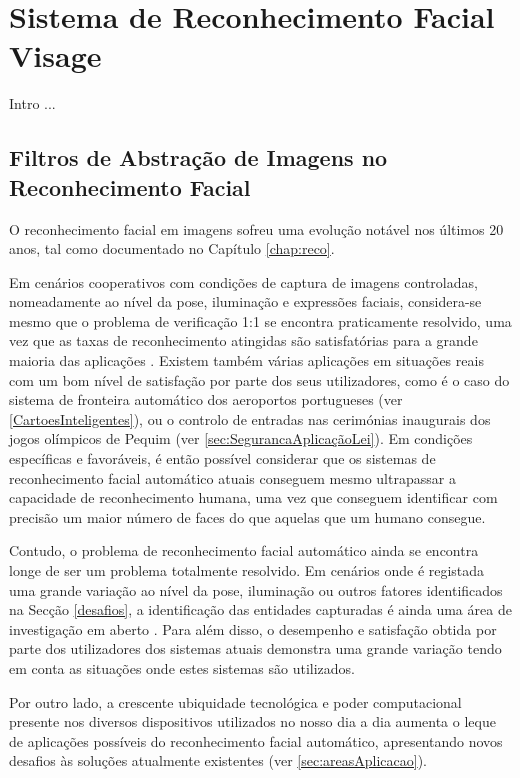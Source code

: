 \chapter{Sistema de Reconhecimento Facial Visage} \label{chap:visage}

Intro ...


\section{Filtros de Abstração de Imagens no Reconhecimento Facial}
O reconhecimento facial em imagens sofreu uma evolução notável nos últimos 20 anos, tal como documentado no Capítulo \ref{chap:reco}. 

Em cenários cooperativos com condições de captura de imagens controladas, nomeadamente ao nível da pose, iluminação e expressões faciais, considera-se mesmo que o problema de verificação 1:1 se encontra praticamente resolvido, uma vez que as taxas de reconhecimento atingidas são satisfatórias para a grande maioria das aplicações \cite{Li2011}. Existem também várias aplicações em situações reais com um bom nível de satisfação por parte dos seus utilizadores, como é o caso do sistema de fronteira automático dos aeroportos portugueses (ver \ref{CartoesInteligentes}), ou o controlo de entradas nas cerimónias inaugurais dos jogos olímpicos de Pequim (ver \ref{sec:SegurancaAplicaçãoLei}). Em condições específicas e favoráveis, é então possível considerar que os sistemas de reconhecimento facial automático atuais conseguem mesmo ultrapassar a capacidade de reconhecimento humana, uma vez que conseguem identificar com precisão um maior número de faces do que aquelas que um humano consegue.

Contudo, o problema de reconhecimento facial automático ainda se encontra longe de ser um problema totalmente resolvido. Em cenários onde é registada uma grande variação ao nível da pose, iluminação ou outros fatores identificados na Secção \ref{desafios}, a identificação das entidades capturadas é ainda uma área de investigação em aberto \cite{Li2011}. Para além disso, o desempenho e satisfação obtida por parte dos utilizadores dos sistemas atuais demonstra uma grande variação tendo em conta as situações onde estes sistemas são utilizados. 

Por outro lado, a crescente ubiquidade tecnológica e poder computacional presente nos diversos dispositivos utilizados no nosso dia a dia aumenta o leque de aplicações possíveis do reconhecimento facial automático, apresentando novos desafios às soluções atualmente existentes (ver \ref{sec:areasAplicacao}).

